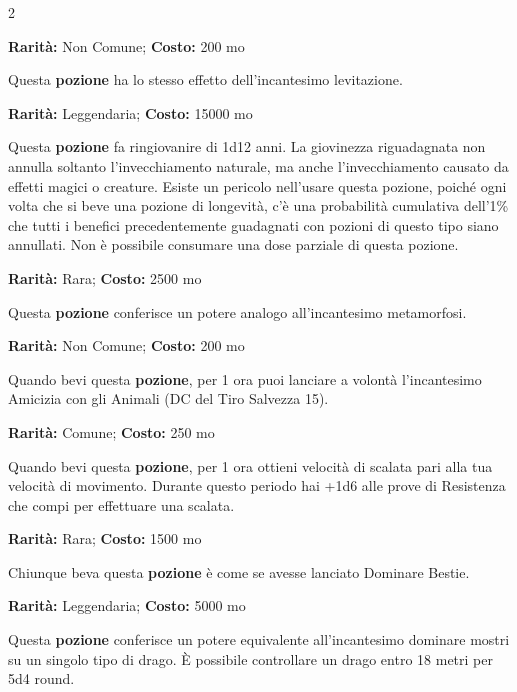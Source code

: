 \begin{multicols}{2}

\textbf{Rarità:} Non Comune; \textbf{Costo:} 200 mo

Questa \textbf{pozione} ha lo stesso effetto dell'incantesimo levitazione.


\textbf{Rarità:} Leggendaria; \textbf{Costo:} 15000 mo

Questa \textbf{pozione} fa ringiovanire di 1d12 anni. La giovinezza riguadagnata non annulla soltanto l'invecchiamento naturale, ma anche l'invecchiamento causato da effetti magici o creature. Esiste un pericolo nell'usare questa pozione, poiché ogni volta che si beve una pozione di longevità, c'è una probabilità cumulativa dell'1\% che tutti i benefici precedentemente guadagnati con pozioni di questo tipo siano annullati. Non è possibile consumare una dose parziale di questa pozione.


\textbf{Rarità:} Rara; \textbf{Costo:} 2500 mo

Questa \textbf{pozione} conferisce un potere analogo all'incantesimo metamorfosi.


\textbf{Rarità:} Non Comune; \textbf{Costo:} 200 mo

Quando bevi questa \textbf{pozione}, per 1 ora puoi lanciare a volontà l'incantesimo Amicizia con gli Animali (DC del Tiro Salvezza 15).


\textbf{Rarità:} Comune; \textbf{Costo:} 250 mo

Quando bevi questa \textbf{pozione}, per 1 ora ottieni velocità di scalata pari alla tua velocità di movimento. Durante questo periodo hai +1d6 alle prove di Resistenza che compi per effettuare una scalata.


\textbf{Rarità:} Rara; \textbf{Costo:} 1500 mo

Chiunque beva questa \textbf{pozione} è come se avesse lanciato Dominare Bestie.


\textbf{Rarità:} Leggendaria; \textbf{Costo:} 5000 mo

Questa \textbf{pozione} conferisce un potere equivalente all'incantesimo dominare mostri su un singolo tipo di drago. È possibile controllare un drago entro 18 metri per 5d4 round.


\end{multicols}
